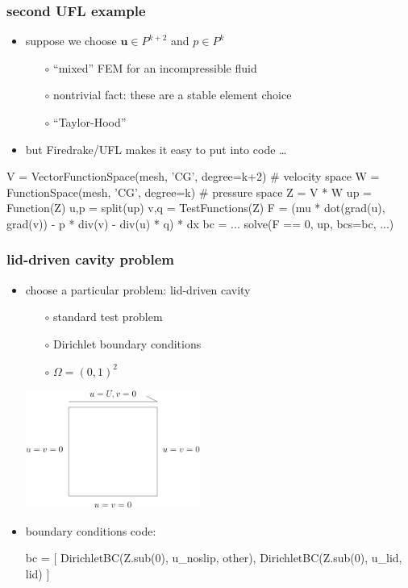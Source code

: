 \documentclass[hide notes,intlimits,usenames,dvipsnames]{beamer}
\newcommand{\bu}{\mathbf{u}}
\begin{document}
\begin{frame}[fragile]
\frametitle{second UFL example}

\begin{itemize}
\item suppose we choose $\bu\in P^{k+2}$ and $p\in P^k$
    \begin{itemize}
    \item[$\circ$] ``mixed'' FEM for an incompressible fluid
    \item[$\circ$] nontrivial fact: these are a stable element choice
    \item[$\circ$] ``Taylor-Hood''
    \end{itemize}
\item but Firedrake/UFL makes it easy to put into code \dots
\end{itemize}

\bigskip
\begin{scode}
V = VectorFunctionSpace(mesh, 'CG', degree=k+2)  # velocity space
W = FunctionSpace(mesh, 'CG', degree=k)          # pressure space
Z = V * W
up = Function(Z)
u,p = split(up)
v,q = TestFunctions(Z)
F = (mu * dot(grad(u), grad(v)) - p * div(v) - div(u) * q) * dx
bc = ...
solve(F == 0, up, bcs=bc, ...)
\end{scode}
\end{frame}


\begin{frame}[fragile]
\frametitle{lid-driven cavity problem}

\begin{itemize}
\item choose a particular problem: lid-driven cavity
    \begin{itemize}
    \item[$\circ$] standard test problem
    \item[$\circ$] Dirichlet boundary conditions
    \item[$\circ$] $\Omega=(0,1)^2$
    \end{itemize}

\vspace{-10mm}
\hfill \includegraphics[width=0.45\textwidth]{lid-driven-cartoon}
\item boundary conditions code:

\begin{scode}
bc = [ DirichletBC(Z.sub(0), u_noslip, other),
       DirichletBC(Z.sub(0), u_lid,    lid)   ]
\end{scode}
\end{itemize}
\end{frame}
\end{document}
